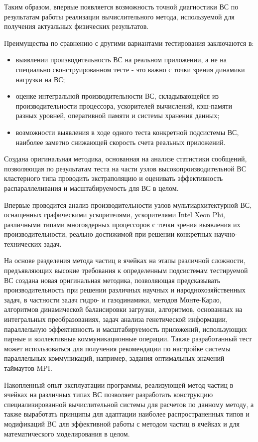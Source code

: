 Таким образом, впервые появляется возможность точной диагностики ВС по результатам работы реализации вычислительного метода, используемой для получения актуальных физических результатов.   

Преимущества по сравнению с другими вариантами тестирования заключаются в:
\begin{itemize}
	\item выявлении производительность ВС на реальном приложении, а не на специально сконструированном тесте - это важно с точки зрения динамики нагрузки на ВС; 
	
	\item оценке интегральной производительности ВС, складывающейся из производительности процессора, ускорителей вычислений, кэш-памяти разных уровней, оперативной памяти и системы хранения данных;
	\item возможности выявления в ходе одного теста конкретной подсистемы ВС, наиболее заметно снижающей скорость счета реальных приложений. 
	
\end{itemize}
Создана оригинальная методика, основанная на анализе статистики сообщений, позволяющая по результатам теста на части узлов высокопроизводительной ВС кластерного типа проводить экстраполяцию и оценивать эффективность распараллеливания и масштабируемость для ВС в целом.

Впервые проводится анализ производительности узлов мультиархитектурной ВС, оснащенных графическими ускорителями, ускорителями Intel Xeon Phi, различными типами многоядерных процессоров с точки зрения выявления их производительности, реально достижимой при решении конкретных научно-технических задач.

На основе разделения метода частиц в ячейках на этапы различной сложности, предъявляющих высокие требования к определенным подсистемам тестируемой ВС создана новая оригинальная методика, позволяющая предсказывать производительность при решении различных научных и народнохозяйственных задач, в частности задач гидро- и газодинамики, методов Монте-Карло, алгоритмов динамической балансировки загрузки, алгоритмов, основанных на интегральных преобразованиях, задач анализа генетической информации, параллельную эффективность и масштабируемость приложений, использующих парные и коллективные коммуникационные операции. Также разработанный тест может использоваться для получения рекомендации по настройке системы параллельных коммуникаций, например, задания оптимальных значений таймаутов MPI.


{\influence} Накопленный опыт эксплуатации программы, реализующей метод частиц в ячейках на различных типах ВС позволяет разработать конструкцию специализированной вычислительной системы для расчетов по данному методу, а также выработать принципы для адаптации наиболее распространенных типов и модификаций ВС для эффективной работы с методом частиц в ячейках и для математического моделирования в целом.

